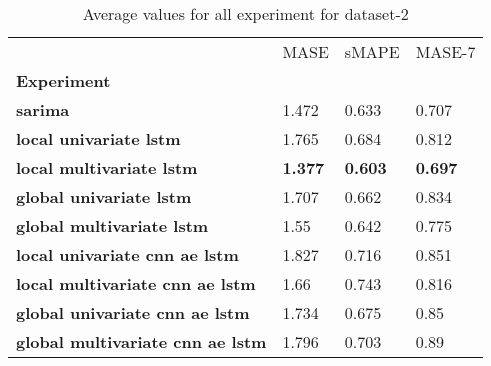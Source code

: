 \begin{table}[h]
\centering
\caption{Average values for all experiment for dataset-2}
\label{table:Average-metric-dataset-2}
\begin{tabular}{llll}
\toprule
{} &            MASE &           sMAPE &          MASE-7 \\
\textbf{Experiment                     } &                 &                 &                 \\
\midrule
\textbf{sarima                         } &           1.472 &           0.633 &           0.707 \\
\textbf{local univariate lstm          } &           1.765 &           0.684 &           0.812 \\
\textbf{local multivariate lstm        } &  \textbf{1.377} &  \textbf{0.603} &  \textbf{0.697} \\
\textbf{global univariate lstm         } &           1.707 &           0.662 &           0.834 \\
\textbf{global multivariate lstm       } &            1.55 &           0.642 &           0.775 \\
\textbf{local univariate cnn ae lstm   } &           1.827 &           0.716 &           0.851 \\
\textbf{local multivariate cnn ae lstm } &            1.66 &           0.743 &           0.816 \\
\textbf{global univariate cnn ae lstm  } &           1.734 &           0.675 &            0.85 \\
\textbf{global multivariate cnn ae lstm} &           1.796 &           0.703 &            0.89 \\
\bottomrule
\end{tabular}
\end{table}
